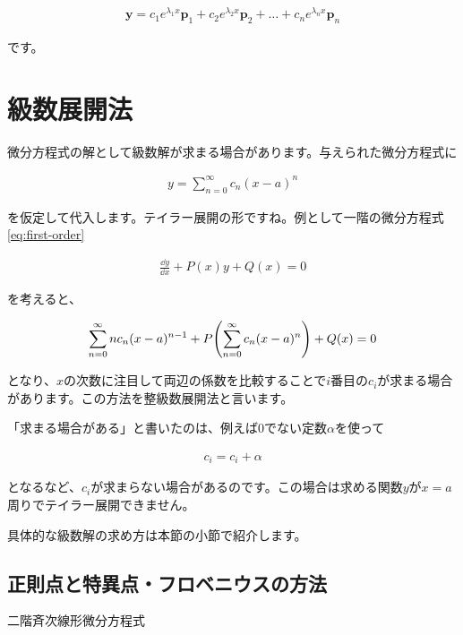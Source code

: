 \begin{eqnarray}
    \boldsymbol{y}=c_1e^{\lambda_1 x}\boldsymbol{p}_1+c_2e^{\lambda_2 x}\boldsymbol{p}_2+\dots+c_ne^{\lambda_n x}\boldsymbol{p}_n
\end{eqnarray}

\noindent
です。






\section{級数展開法}
\label{expansion}
微分方程式の解として級数解が求まる場合があります。与えられた微分方程式に

\begin{eqnarray}
    y=\sum_{n=0}^\infty c_n(x-a)^n
\end{eqnarray}

\noindent
を仮定して代入します。テイラー展開の形ですね。例として一階の微分方程式\ref{eq:first-order}

\begin{eqnarray}
    \frac{\dd y}{\dd x}+P(x)y+Q(x)=0 \nonumber
\end{eqnarray}

\noindent
を考えると、

\begin{eqnarray}
    \sum_{n=0}^\infty nc_n(x-a)^{n-1}+P\pqty{\sum_{n=0}^\infty c_n(x-a)^n}+Q(x)=0
\end{eqnarray}

\noindent
となり、$x$の次数に注目して両辺の係数を比較することで$i$番目の$c_i$が求まる場合があります。この方法を整級数展開法と言います。

「求まる場合がある」と書いたのは、例えば0でない定数$\alpha$を使って

\begin{eqnarray}
c_i=c_i+\alpha
\end{eqnarray}

\noindent
となるなど、$c_i$が求まらない場合があるのです。この場合は求める関数$y$が$x=a$周りでテイラー展開できません。

具体的な級数解の求め方は本節の小節で紹介します。








\subsection{正則点と特異点・フロベニウスの方法}
\label{regular-singular}
二階斉次線形微分方程式

